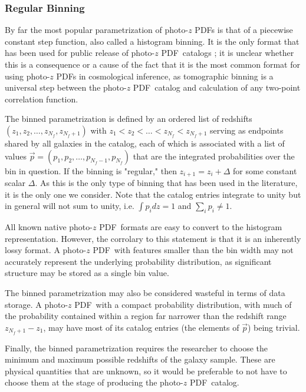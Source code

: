 \documentclass[\docopts]{\docclass}
\newcommand{\pz}{photo-$z$ PDF}
\begin{document}
\subsubsection{Regular Binning}
\label{sec:bins}

By far the most popular parametrization of \pz s is that of a piecewise 
constant step function, also called a histogram binning.  It is the only format 
that has been used for public release of \pz\ catalogs 
\citep{tanaka_photometric_2017, sheldon_photometric_2012}; it is unclear 
whether this is a consequence or a cause of the fact that it is the most common 
format for using \pz s in cosmological inference, as tomographic binning is a 
universal step between the \pz\ catalog and calculation of any two-point 
correlation function.

The binned parametrization is defined by an ordered list of redshifts $(z_{1}, 
z_{2}, \dots, z_{N_{f}}, z_{N_{f}+1})$ with $z_{1} < z_{2} < \dots < z_{N_{f}} 
< z_{N_{f}+1}$ serving as endpoints shared by all galaxies in the catalog, each 
of which is associated with a list of values $\vec{p} = (p_{1}, p_{2}, \dots, 
p_{N_{f}-1}, p_{N_{f}})$ that are the integrated probabilities over the bin in 
question.  If the binning is "regular," then $z_{i+1}=z_{i}+\Delta$ for some 
constant scalar $\Delta$.  As this is the only type of binning that has been 
used in the literature, it is the only one we consider.  Note that the catalog 
entries integrate to unity but in general will not sum to unity, i.e. $\int 
p_{i} dz = 1$ and $\sum_{i}p_{i}\neq1$.

All known native \pz\ formats are easy to convert to the histogram 
representation.  However, the corrolary to this statement is that it is an 
inherently lossy format.  A \pz\ with features smaller than the bin width may 
not accurately represent the underlying probability distribution, as 
significant structure may be stored as a single bin value.

The binned parametrization may also be considered wasteful in terms of data 
storage.  A \pz\ with a compact probability distribution, with much of the 
probability contained within a region far narrower than the redshift range 
$z_{N_{f}+1} - z_{1}$, may have most of its catalog entries (the elements of 
$\vec{p}$) being trivial.

Finally, the binned parametrization requires the researcher to choose the 
minimum and maximum possible redshifts of the galaxy sample.  These are 
physical quantities that are unknown, so it would be preferable to not have to 
choose them at the stage of producing the \pz\ catalog.
\end{document}

